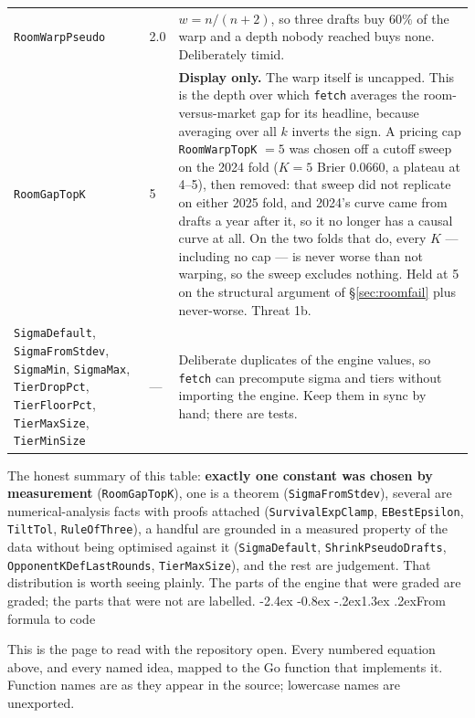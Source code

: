 \documentclass[10pt,a4paper]{article}
\makeatletter
\theoremstyle{plain}
\theoremstyle{definition}
\theoremstyle{remark}
\newcommand{\code}[1]{\texttt{\small #1}}
\renewcommand\section{\@startsection{section}{1}{\z@}%
  {-2.4ex \@plus -0.8ex \@minus -.2ex}{1.3ex \@plus.2ex}{\normalfont\Large\bfseries}}
\makeatother
\begin{document}
\begin{longtable}{@{}p{}p{}p{}@{}}
\code{RoomWarpPseudo} & 2.0 & $w = n/(n+2)$, so three drafts buy $60\%$ of the warp and a depth nobody reached buys none. Deliberately timid. \\
\code{RoomGapTopK} & 5 & \textbf{Display only.} The warp itself is uncapped. This is the depth over which \code{fetch} averages the room-versus-market gap for its headline, because averaging over all $k$ inverts the sign. A pricing cap \code{RoomWarpTopK} $=5$ was chosen off a cutoff sweep on the 2024 fold ($K=5$ Brier $0.0660$, a plateau at 4--5), then removed: that sweep did not replicate on either 2025 fold, and 2024's curve came from drafts a year after it, so it no longer has a causal curve at all. On the two folds that do, every $K$ --- including no cap --- is never worse than not warping, so the sweep excludes nothing. Held at 5 on the structural argument of \S\ref{sec:roomfail} plus never-worse. Threat 1b. \\
\code{SigmaDefault}, \code{SigmaFromStdev}, \code{SigmaMin}, \code{SigmaMax}, \code{TierDropPct}, \code{TierFloorPct}, \code{TierMaxSize}, \code{TierMinSize} & --- & Deliberate duplicates of the engine values, so \code{fetch} can precompute sigma and tiers without importing the engine. Keep them in sync by hand; there are tests. \\
\bottomrule
\end{longtable}
\endgroup

The honest summary of this table: \textbf{exactly one constant was chosen by
measurement} (\code{RoomGapTopK}), one is a theorem (\code{SigmaFromStdev}), several
are numerical-analysis facts with proofs attached (\code{SurvivalExpClamp},
\code{EBestEpsilon}, \code{TiltTol}, \code{RuleOfThree}), a handful are grounded in a
measured property of the data without being optimised against it
(\code{SigmaDefault}, \code{ShrinkPseudoDrafts}, \code{OpponentKDefLastRounds},
\code{TierMaxSize}), and the rest are judgement. That distribution is worth seeing
plainly. The parts of the engine that were graded are graded; the parts that were not are
labelled.
\section{From formula to code}
\label{sec:codemap}

This is the page to read with the repository open. Every numbered equation above, and
every named idea, mapped to the Go function that implements it. Function names are as
they appear in the source; lowercase names are unexported.
\end{document}
